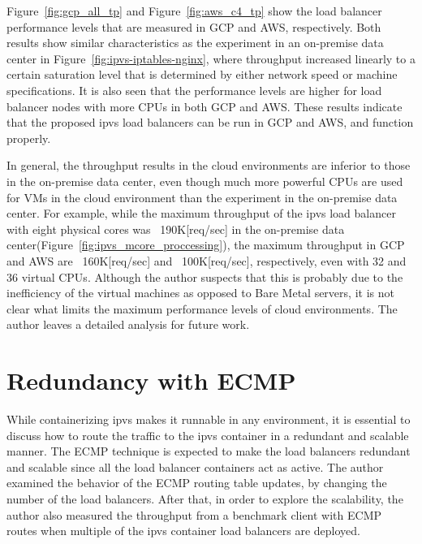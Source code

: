 Figure~\ref{fig:gcp_all_tp} and Figure~\ref{fig:aws_c4_tp} show the load balancer performance levels that are measured in GCP and AWS, respectively. 
Both results show similar characteristics as the experiment in an on-premise data center in Figure~\ref{fig:ipvs-iptables-nginx}, where throughput increased linearly to a certain saturation level that is determined by either network speed or machine specifications.
It is also seen that the performance levels are higher for load balancer nodes with more CPUs in both GCP and AWS. 
These results indicate that the proposed ipvs load balancers can be run in GCP and AWS, and function properly.

In general, the throughput results in the cloud environments are inferior to those in the on-premise data center, even though much more powerful CPUs are used for VMs in the cloud environment than the experiment in the on-premise data center.
For example, while the maximum throughput of the ipvs load balancer with eight physical cores was ~190K[req/sec] in the on-premise data center(Figure~\ref{fig:ipvs_mcore_proccessing}), the maximum throughput in GCP and AWS are ~160K[req/sec] and ~100K[req/sec], respectively, even with 32 and 36 virtual CPUs.
Although the author suspects that this is probably due to the inefficiency of the virtual machines as opposed to Bare Metal servers,
it is not clear what limits the maximum performance levels of cloud environments. 
The author leaves a detailed analysis for future work.



\FloatBarrier

\section{Redundancy with ECMP}

While containerizing ipvs makes it runnable in any environment, it is essential to discuss how to route the traffic to the ipvs container in a redundant and scalable manner.
The ECMP technique is expected to make the load balancers redundant and scalable since all the load balancer containers act as active.
The author examined the behavior of the ECMP routing table updates, by changing the number of the load balancers.
After that, in order to explore the scalability, the author also measured the throughput from a benchmark client with ECMP routes when multiple of the ipvs container load balancers are deployed.

